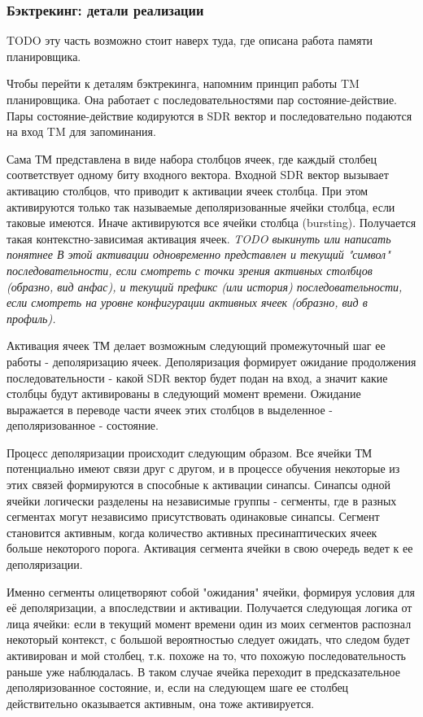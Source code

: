 \documentclass[a4paper]{article}
\begin{document}
\subsubsection{Бэктрекинг: детали реализации}

TODO эту часть возможно стоит наверх туда, где описана работа памяти планировщика.

Чтобы перейти к деталям бэктрекинга, напомним принцип работы TM планировщика. Она работает с последовательностями пар состояние-действие. Пары состояние-действие кодируются в SDR вектор и последовательно подаются на вход TM для запоминания.

Сама ТМ представлена в виде набора столбцов ячеек, где каждый столбец соответствует одному биту входного вектора. Входной SDR вектор вызывает активацию столбцов, что приводит к активации ячеек столбца. При этом активируются только так называемые деполяризованные ячейки столбца, если таковые имеются. Иначе активируются все ячейки столбца (bursting). Получается такая контекстно-зависимая активация ячеек. \textit{TODO выкинуть или написать понятнее В этой активации одновременно представлен и текущий "символ" последовательности, если смотреть с точки зрения активных столбцов (образно, вид анфас), и текущий префикс (или история) последовательности, если смотреть на уровне конфигурации активных ячеек (образно, вид в профиль).}

Активация ячеек ТМ делает возможным следующий промежуточный шаг ее работы - деполяризацию ячеек. Деполяризация формирует ожидание продолжения последовательности - какой SDR вектор будет подан на вход, а значит какие столбцы будут активированы в следующий момент времени. Ожидание выражается в переводе части ячеек этих столбцов в выделенное - деполяризованное - состояние.

Процесс деполяризации происходит следующим образом. Все ячейки ТМ потенциально имеют связи друг с другом, и в процессе обучения некоторые из этих связей формируются в способные к активации синапсы. Синапсы одной ячейки логически разделены на независимые группы - сегменты, где в разных сегментах могут независимо присутствовать одинаковые синапсы. Сегмент становится активным, когда количество активных пресинаптических ячеек больше некоторого порога. Активация сегмента ячейки в свою очередь ведет к ее деполяризации.

Именно сегменты олицетворяют собой "ожидания" ячейки, формируя условия для её деполяризации, а впоследствии и активации. Получается следующая логика от лица ячейки: если в текущий момент времени один из моих сегментов распознал некоторый контекст, с большой вероятностью следует ожидать, что следом будет активирован и мой столбец, т.к. похоже на то, что похожую последовательность раньше уже наблюдалась. В таком случае ячейка переходит в предсказательное деполяризованное состояние, и, если на следующем шаге ее столбец действительно оказывается активным, она тоже активируется.
\end{document}
